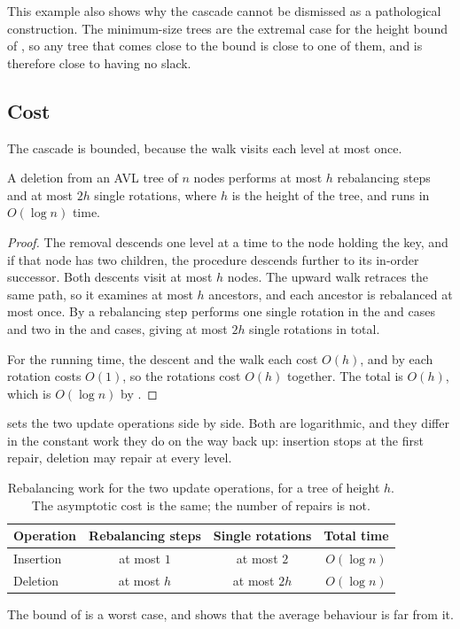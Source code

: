 This example also shows why the cascade cannot be dismissed as a pathological
construction. The minimum-size trees are the extremal case for the height bound
of , so any tree that comes close to the bound is close to
one of them, and is therefore close to having no slack.

\subsection{Cost}

The cascade is bounded, because the walk visits each level at most once.

\begin{theorem}
\label{thm:deletebound}
A deletion from an AVL tree of $n$ nodes performs at most $h$ rebalancing steps
and at most $2h$ single rotations, where $h$ is the height of the tree, and runs
in $O(\log n)$ time.
\end{theorem}

\begin{proof}
The removal descends one level at a time to the node holding the key, and if that
node has two children, the procedure descends further to its in-order successor.
Both descents visit at most $h$ nodes. The upward walk retraces the same path, so
it examines at most $h$ ancestors, and each ancestor is rebalanced at most once.
By  a rebalancing step performs one single rotation in the
 and  cases and two in the  and  cases,
giving at most $2h$ single rotations in total.

For the running time, the descent and the walk each cost $O(h)$, and by
 each rotation costs $O(1)$, so the rotations cost $O(h)$
together. The total is $O(h)$, which is $O(\log n)$ by .
\end{proof}

 sets the two update operations side by side. Both are
logarithmic, and they differ in the constant work they do on the way back up:
insertion stops at the first repair, deletion may repair at every level.

\begin{table}[t]
  \centering
  \caption{Rebalancing work for the two update operations, for a tree of height
  $h$. The asymptotic cost is the same; the number of repairs is not.}
  \label{tab:insdel}
  \begin{tabular}{@{}lccc@{}}
    \toprule
    Operation & Rebalancing steps & Single rotations & Total time \\
    \midrule
    Insertion & at most $1$  & at most $2$  & $O(\log n)$ \\
    Deletion  & at most $h$  & at most $2h$ & $O(\log n)$ \\
    \bottomrule
  \end{tabular}
\end{table}

The bound of  is a worst case, and  shows
that the average behaviour is far from it.
